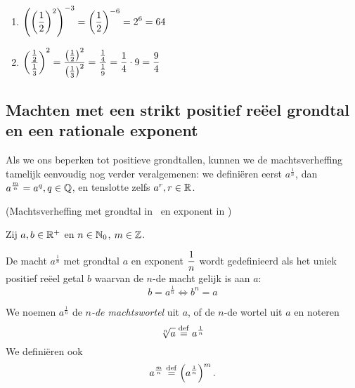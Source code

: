 \documentclass{ximera}
\begin{document}
\begin{example} \ 
	
	\begin{enumerate}
	\item $\displaystyle{\left(\left(\frac{1}{2}\right)^{2}\right)^{-3}=\left(\frac{1}{2}\right)^{-6}=2^{6}=64}$
	\item $\displaystyle{\left(\frac{\frac{1}{2}}{\frac{1}{3}}\right)^{2}=\frac{\left(\frac{1}{2}\right)^{2}}{\left(\frac{1}{3}\right)^{2}}=
		\frac{\frac{1}{4}}{\frac{1}{9}}=\frac{1}{4} \cdot 9=\frac{9}{4}}$
\end{enumerate}
\end{example}

\subsection{Machten met een strikt positief re\"eel grondtal en een rationale exponent}

Als we ons beperken tot positieve grondtallen, kunnen we de machtsverheffing tamelijk eenvoudig nog verder veralgemenen: we definiëren eerst $a^{\frac1n}$, dan $a^{\frac mn} = a^q, q\in\mathbb{Q}$, en tenslotte zelfs $a^r, r\in\mathbb{R}$.
 

\begin{definition}(Machtsverheffing met grondtal in \Rplus\ en exponent in \Q)
	
	
	Zij $a,b\in\mathbb{R}^+$ en $n\in\mathbb{N}_0$, $m\in\mathbb{Z}$. 
	
	De macht $a^{\frac{1}{n}}$ met grondtal $a$ en exponent $\displaystyle\frac{1}{n}$ wordt
	gedefinieerd als het uniek positief re\"eel getal $b$ waarvan de $n$-de
	macht gelijk is aan $a$:
	\[b = a^\frac 1n \iff b^n = a\]
	
	We noemen $a^{\frac{1}{n}}$ de \textit{$n$-de machtswortel }uit $a$, of de $n$-de wortel uit $a$ en noteren
	\[
		\sqrt[n]{a} \overset{\mathrm{def}}{=} a^\frac 1n
	\]
	We definiëren ook
	\[a^{\frac{m}{n}}\overset{\mathrm{def}}{=} \left(a^{\frac{1}{n}}\right)^m.\]
\end{definition}
\end{document}
